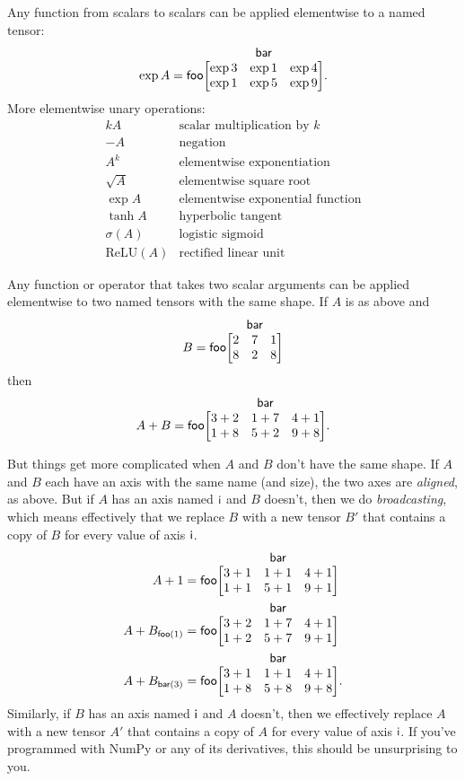 \documentclass{article}
\makeatletter
\newcommand{\nmatrix}[3]{\name{#1}\begin{array}[b]{@{}c@{}}\name{#2}\\\begin{bmatrix}#3\end{bmatrix}\end{array}}
\makeatother
\begin{document}
Any function from scalars to scalars can be applied elementwise to a named tensor:
\begin{equation*}
\exp A = \nmatrix{foo}{bar}{
  \exp 3 & \exp 1 & \exp 4 \\
  \exp 1 & \exp 5 & \exp 9
}.
\end{equation*}
More elementwise unary operations:
\[\begin{array}{cl}
kA & \text{scalar multiplication by $k$} \\
-A & \text{negation} \\
A^k & \text{elementwise exponentiation} \\
\sqrt{A} &\text{elementwise square root} \\
\exp A & \text{elementwise exponential function} \\
\tanh A & \text{hyperbolic tangent} \\
\sigma(A) & \text{logistic sigmoid} \\
\text{ReLU}(A) & \text{rectified linear unit}
\end{array}\]

Any function or operator that takes two scalar arguments can be applied elementwise to two named tensors with the same shape. If $A$ is as above and
\begin{equation*}
B = \nmatrix{foo}{bar}{
  2 & 7 & 1 \\
  8 & 2 & 8
}
\end{equation*}
then
\begin{equation*}
A + B = \nmatrix{foo}{bar}{
  3+2 & 1+7 & 4+1 \\
  1+8 & 5+2 & 9+8
}.
\end{equation*}

But things get more complicated when $A$ and $B$ don't have the same shape. If $A$ and $B$ each have an axis with the same name (and size), the two axes are \emph{aligned}, as above. But if $A$ has an axis named $\mathsf{i}$ and $B$ doesn't, then we do \emph{broadcasting}, which means effectively that we replace $B$ with a new tensor $B'$ that contains a copy of $B$ for every value of axis $\mathsf{i}$.
\begin{align*}
A + 1 &= \nmatrix{foo}{bar}{
  3+1 & 1+1 & 4+1 \\
  1+1 & 5+1 & 9+1
} \\
A + B_{\nidx{foo}{1}} &= \nmatrix{foo}{bar}{
  3+2 & 1+7 & 4+1 \\
  1+2 & 5+7 & 9+1
} \\
A + B_{\nidx{bar}{3}} &= \nmatrix{foo}{bar}{
  3+1 & 1+1 & 4+1 \\
  1+8 & 5+8 & 9+8
}.
\end{align*}
Similarly, if $B$ has an axis named $\mathsf{i}$ and $A$ doesn't, then we effectively replace $A$ with a new tensor $A'$ that contains a copy of $A$ for every value of axis $\mathsf{i}$. If you've programmed with NumPy or any of its derivatives, this should be unsurprising to you.
\end{document}
